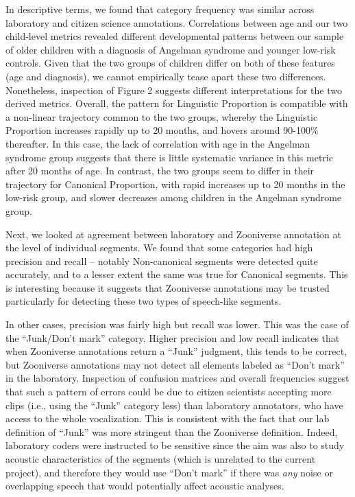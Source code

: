 \documentclass[english,,man]{apa6}
\begin{document}
In descriptive terms, we found that category frequency was similar across laboratory and citizen science annotations. Correlations between age and our two child-level metrics revealed different developmental patterns between our sample of older children with a diagnosis of Angelman syndrome and younger low-risk controls. Given that the two groups of children differ on both of these features (age and diagnosis), we cannot empirically tease apart these two differences. Nonetheless, inspection of Figure 2 suggests different interpretations for the two derived metrics. Overall, the pattern for Linguistic Proportion is compatible with a non-linear trajectory common to the two groups, whereby the Linguistic Proportion increases rapidly up to 20 months, and hovers around 90-100\% thereafter. In this case, the lack of correlation with age in the Angelman syndrome group suggests that there is little systematic variance in this metric after 20 months of age. In contrast, the two groups seem to differ in their trajectory for Canonical Proportion, with rapid increases up to 20 months in the low-risk group, and slower decreases among children in the Angelman syndrome group.

Next, we looked at agreement between laboratory and Zooniverse annotation at the level of individual segments. We found that some categories had high precision and recall -- notably Non-canonical segments were detected quite accurately, and to a lesser extent the same was true for Canonical segments. This is interesting because it suggests that Zooniverse annotations may be trusted particularly for detecting these two types of speech-like segments.

In other cases, precision was fairly high but recall was lower. This was the case of the \enquote{Junk/Don't mark} category. Higher precision and low recall indicates that when Zooniverse annotations return a \enquote{Junk} judgment, this tends to be correct, but Zooniverse annotations may not detect all elements labeled as \enquote{Don't mark} in the laboratory. Inspection of confusion matrices and overall frequencies suggest that such a pattern of errors could be due to citizen scientists accepting more clips (i.e., using the \enquote{Junk} category less) than laboratory annotators, who have access to the whole vocalization. This is consistent with the fact that our lab definition of \enquote{Junk} was more stringent than the Zooniverse definition. Indeed, laboratory coders were instructed to be sensitive since the aim was also to study acoustic characteristics of the segments (which is unrelated to the current project), and therefore they would use \enquote{Don't mark} if there was \emph{any} noise or overlapping speech that would potentially affect acoustic analyses.
\end{document}
